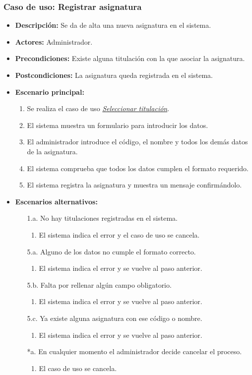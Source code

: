 \documentclass{book}
\begin{document}
\subsubsection*{Caso de uso: Registrar asignatura}
\begin{itemize}
\item{\bf Descripción:} Se da de alta una nueva asignatura en el sistema.
\item{\bf Actores:} Administrador.
\item{\bf Precondiciones:} Existe alguna titulación con la que asociar la asignatura.
\item{\bf Postcondiciones:} La asignatura queda registrada en el sistema.
\item{\bf Escenario principal:}
	\begin{enumerate}
 	\item Se realiza el caso de uso {\em\hyperref[select_titulacion]{Seleccionar titulación}}.
	\item El sistema muestra un formulario para introducir los datos.
	\item El administrador introduce el código, el nombre y todos los demás datos de la asignatura.
	\item El sistema comprueba que todos los datos cumplen el formato requerido.
	\item El sistema registra la asignatura y muestra un mensaje confirmándolo.
	\end{enumerate}
\item{\bf Escenarios alternativos:}
	\begin{itemize}
	\item[1.a.] No hay titulaciones registradas en el sistema.
		\begin{enumerate}
		\item El sistema indica el error y el caso de uso se cancela.
		\end{enumerate}
	\item[5.a.] Alguno de los datos no cumple el formato correcto.
		\begin{enumerate}
		\item El sistema indica el error y se vuelve al paso anterior.
		\end{enumerate}
	\item[5.b.] Falta por rellenar algún campo obligatorio.
		\begin{enumerate}
		\item El sistema indica el error y se vuelve al paso anterior.
		\end{enumerate}
	\item[5.c.] Ya existe alguna asignatura con ese código o nombre.
		\begin{enumerate}
		\item El sistema indica el error y se vuelve al paso anterior.
		\end{enumerate}
	\item[*a.] En cualquier momento el administrador decide cancelar el proceso.
		\begin{enumerate}
		\item El caso de uso se cancela.
		\end{enumerate}
	\end{itemize}
\end{itemize}
\end{document}
